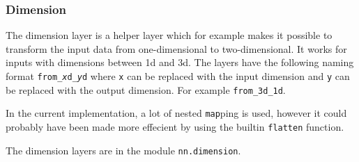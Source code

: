 

\subsubsection{Dimension}%
\label{ssub:impl_dimension}

The dimension layer is a helper layer which for example makes it possible to transform the input data from one-dimensional to two-dimensional.
It works for inputs with dimensions between 1d and 3d. The layers have the following naming format \texttt{from\_\textit{x}d\_\textit{y}d} where \texttt{x} can be replaced with the input dimension and \texttt{y} can be replaced with the output dimension. For example \texttt{from\_3d\_1d}.

In the current implementation, a lot of nested \texttt{map}ping is used, however it could probably have been made more effecient by using the builtin \texttt{flatten} function.

The dimension layers are in the module \texttt{nn.dimension}.

